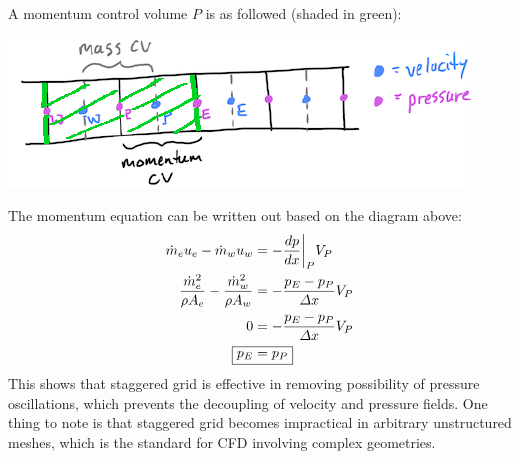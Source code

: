 \documentclass[11pt]{article}
\begin{document}
A momentum control volume \(P\) is as followed (shaded in green): 
\begin{center}
\includegraphics[scale=0.8]{../pic/staggered_1d_momentum.png}
\end{center}
The momentum equation can be written out based on the diagram above:
\begin{equation*}
\begin{aligned}
\dot{m}_e u_e - \dot{m}_wu_w &= -\frac{dp}{dx}\biggr\rvert_P V_P\\
\frac{\dot{m}_e^2}{\rho A_e} - \frac{\dot{m}_w^2}{\rho A_w} &= -\frac{p_E - p_P}{\Delta x} V_P\\
0 &= -\frac{p_E - p_P}{\Delta x} V_P\\
\Aboxed{p_E &= p_P}
\end{aligned}
\end{equation*}
This shows that staggered grid is effective in removing possibility of pressure oscillations, which prevents
the decoupling of velocity and pressure fields. One thing to note is that staggered grid becomes impractical
in arbitrary unstructured meshes, which is the standard for CFD involving complex geometries.
\end{document}
